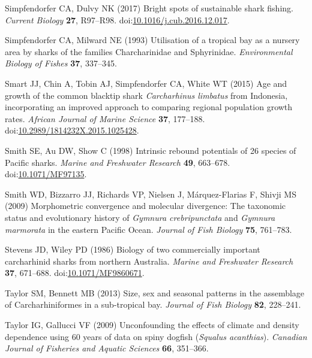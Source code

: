 \documentclass[]{article}
\begin{document}
\leavevmode\hypertarget{ref-simpfendorfer_bright_2017}{}%
Simpfendorfer CA, Dulvy NK (2017) Bright spots of sustainable shark
fishing. \emph{Current Biology} \textbf{27}, R97--R98.
doi:\href{https://doi.org/10.1016/j.cub.2016.12.017}{10.1016/j.cub.2016.12.017}.

\leavevmode\hypertarget{ref-simpfendorfer_utilisation_1993}{}%
Simpfendorfer CA, Milward NE (1993) Utilisation of a tropical bay as a
nursery area by sharks of the families Charcharinidae and Sphyrinidae.
\emph{Environmental Biology of Fishes} \textbf{37}, 337--345.

\leavevmode\hypertarget{ref-smart_age_2015}{}%
Smart JJ, Chin A, Tobin AJ, Simpfendorfer CA, White WT (2015) Age and
growth of the common blacktip shark \emph{Carcharhinus limbatus} from
Indonesia, incorporating an improved approach to comparing regional
population growth rates. \emph{African Journal of Marine Science}
\textbf{37}, 177--188.
doi:\href{https://doi.org/10.2989/1814232X.2015.1025428}{10.2989/1814232X.2015.1025428}.

\leavevmode\hypertarget{ref-smith_intrinsic_1998}{}%
Smith SE, Au DW, Show C (1998) Intrinsic rebound potentials of 26
species of Pacific sharks. \emph{Marine and Freshwater Research}
\textbf{49}, 663--678.
doi:\href{https://doi.org/10.1071/MF97135}{10.1071/MF97135}.

\leavevmode\hypertarget{ref-smith_morphometric_2009}{}%
Smith WD, Bizzarro JJ, Richards VP, Nielsen J, Márquez-Flarias F, Shivji
MS (2009) Morphometric convergence and molecular divergence: The
taxonomic status and evolutionary history of \emph{Gymnura
crebripunctata} and \emph{Gymnura marmorata} in the eastern Pacific
Ocean. \emph{Journal of Fish Biology} \textbf{75}, 761--783.

\leavevmode\hypertarget{ref-stevens_biology_1986}{}%
Stevens JD, Wiley PD (1986) Biology of two commercially important
carcharhinid sharks from northern Australia. \emph{Marine and Freshwater
Research} \textbf{37}, 671--688.
doi:\href{https://doi.org/10.1071/MF9860671}{10.1071/MF9860671}.

\leavevmode\hypertarget{ref-taylor_size_2013}{}%
Taylor SM, Bennett MB (2013) Size, sex and seasonal patterns in the
assemblage of Carcharhiniformes in a sub-tropical bay. \emph{Journal of
Fish Biology} \textbf{82}, 228--241.

\leavevmode\hypertarget{ref-taylor_unconfounding_2009}{}%
Taylor IG, Gallucci VF (2009) Unconfounding the effects of climate and
density dependence using 60 years of data on spiny dogfish
(\emph{Squalus acanthias}). \emph{Canadian Journal of Fisheries and
Aquatic Sciences} \textbf{66}, 351--366.
\end{document}
